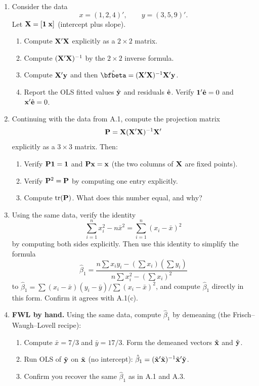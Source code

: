 \documentclass{article}
\begin{document}
\begin{enumerate}[label=\textbf{A.\arabic*},leftmargin=*,itemsep=10pt]

\item  Consider the data
$$x = (1, 2, 4)',\qquad y = (3, 5, 9)'.$$
Let ${\mathbf X} = [\mathbf 1\;\mathbf x]$ (intercept plus slope).
\begin{enumerate}[label=(\alph*)]
  \item Compute ${\mathbf X}'{\mathbf X}$ explicitly as a $2\times 2$ matrix.
  \item Compute $({\mathbf X}'{\mathbf X})^{-1}$ by the $2\times 2$ inverse formula.
  \item Compute ${\mathbf X}'{\mathbf y}$ and then $\hat\bfbeta = (\bfX'\bfX)^{-1}\bfX'\bfy$.
  \item Report the OLS fitted values $\hat{{\mathbf y}}$ and residuals $\hat{{\mathbf e}}$.  Verify $\mathbf 1'\hat{{\mathbf e}} = 0$ and ${\mathbf x}'\hat{{\mathbf e}} = 0$.
\end{enumerate}

\item  Continuing with the data from A.1, compute the projection matrix
$${\mathbf P} = {\mathbf X}({\mathbf X}'{\mathbf X})^{-1}{\mathbf X}'$$
explicitly as a $3\times 3$ matrix.  Then:
\begin{enumerate}[label=(\alph*)]
  \item Verify ${\mathbf P}\mathbf 1 = \mathbf 1$ and ${\mathbf P}{\mathbf x} = {\mathbf x}$ (the two columns of ${\mathbf X}$ are fixed points).
  \item Verify ${\mathbf P}^2 = {\mathbf P}$ by computing one entry explicitly.
  \item Compute $\text{tr}({\mathbf P})$.  What does this number equal, and why?
\end{enumerate}

\item  Using the same data, verify the identity
$$\sum_{i=1}^n x_i^2 - n\bar x^2 = \sum_{i=1}^n (x_i - \bar x)^2$$
by computing both sides explicitly.  Then use this identity to simplify the formula
$$\hat\beta_1 = \frac{n\sum x_i y_i - (\sum x_i)(\sum y_i)}{n\sum x_i^2 - (\sum x_i)^2}$$
to $\hat\beta_1 = \sum (x_i - \bar x)(y_i - \bar y)/\sum(x_i - \bar x)^2$, and compute $\hat\beta_1$ directly in this form.  Confirm it agrees with A.1(c).

\item  \textbf{FWL by hand.}  Using the same data, compute $\hat\beta_1$ by demeaning (the Frisch--Waugh--Lovell recipe):
\begin{enumerate}[label=(\alph*)]
  \item Compute $\bar x = 7/3$ and $\bar y = 17/3$.  Form the demeaned vectors $\tilde{{\mathbf x}}$ and $\tilde{{\mathbf y}}$.
  \item Run OLS of $\tilde{{\mathbf y}}$ on $\tilde{{\mathbf x}}$ (no intercept): $\hat\beta_1 = (\tilde{{\mathbf x}}'\tilde{{\mathbf x}})^{-1}\tilde{{\mathbf x}}'\tilde{{\mathbf y}}$.
  \item Confirm you recover the same $\hat\beta_1$ as in A.1 and A.3.
\end{enumerate}


\end{enumerate}
\end{document}
